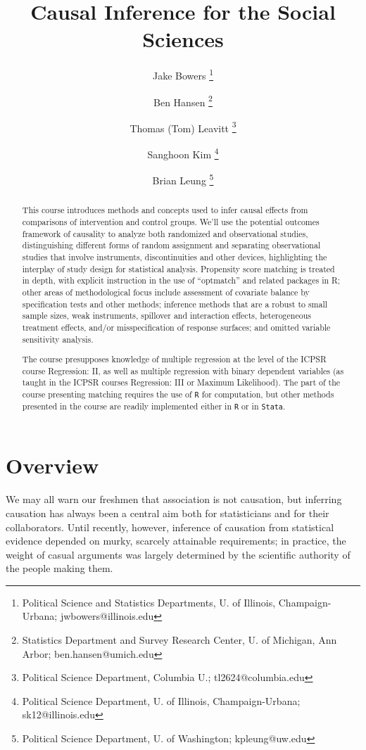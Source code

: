 \documentclass[12pt]{article}
\title{Causal Inference for the Social Sciences}
\author{Jake Bowers \thanks{Political Science and Statistics
    Departments, U. of Illinois, Champaign-Urbana; jwbowers@illinois.edu}
\and Ben Hansen \thanks{Statistics Department and Survey Research Center, U. of Michigan, Ann Arbor; ben.hansen@umich.edu} \and Thomas (Tom) Leavitt \thanks{Political Science Department, Columbia U.; \mbox{tl2624@columbia.edu}} \and Sanghoon Kim \thanks{Political Science Department, U. of Illinois, Champaign-Urbana; \mbox{sk12@illinois.edu}} \and Brian Leung \thanks{Political Science Department, U. of Washington; \mbox{kpleung@uw.edu}}}
\begin{document}
\maketitle
\begin{abstract}
\noindent This course introduces methods and concepts used to infer causal effects from comparisons of intervention and control groups.  We'll use the potential outcomes framework of causality to analyze both randomized and observational studies, distinguishing different forms of random assignment and separating observational studies that involve instruments, discontinuities and other devices, highlighting the interplay of study design for statistical analysis.  Propensity score matching is treated in depth, with explicit instruction in the use of ``optmatch'' and related packages in R; other areas of methodological focus include assessment of covariate balance by specification tests and other methods; inference methods that are a robust to small sample sizes, weak instruments, spillover and interaction effects, heterogeneous treatment effects, and/or misspecification of response surfaces; and omitted variable sensitivity analysis.  %

The course presupposes knowledge of multiple regression at the level
of the ICPSR course Regression: II, as well as multiple regression
with binary dependent variables (as taught in the ICPSR courses
Regression: III or Maximum Likelihood).  The part of the course presenting matching requires the use of \texttt{R} for computation, but other methods presented in the course are readily implemented either in \texttt{R} or in \texttt{Stata}.
\end{abstract}




\clearpage

\nobibliography*


\section*{Overview}

We may all warn our freshmen that association is not causation, but inferring causation has always been a central aim both for statisticians and for their collaborators. Until recently, however, inference of causation from statistical evidence depended on murky, scarcely attainable requirements; in practice, the weight of casual arguments was largely determined by the scientific authority of the people making them.
\end{document}
